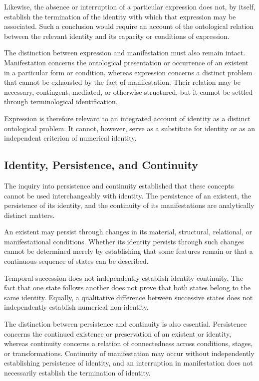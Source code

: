 Likewise, the absence or interruption of a particular
expression does not, by itself, establish the termination
of the identity with which that expression may be associated.
Such a conclusion would require an account of the ontological
relation between the relevant identity and its capacity or
conditions of expression.

The distinction between expression and manifestation must
also remain intact. Manifestation concerns the ontological
presentation or occurrence of an existent in a particular
form or condition, whereas expression concerns a distinct
problem that cannot be exhausted by the fact of manifestation.
Their relation may be necessary, contingent, mediated, or
otherwise structured, but it cannot be settled through
terminological identification.

Expression is therefore relevant to an integrated account
of identity as a distinct ontological problem. It cannot,
however, serve as a substitute for identity or as an
independent criterion of numerical identity.


\subsection{Identity, Persistence, and Continuity}

The inquiry into persistence and continuity established
that these concepts cannot be used interchangeably with
identity. The persistence of an existent, the persistence
of its identity, and the continuity of its manifestations
are analytically distinct matters.

An existent may persist through changes in its material,
structural, relational, or manifestational conditions.
Whether its identity persists through such changes cannot
be determined merely by establishing that some features
remain or that a continuous sequence of states can be
described.

Temporal succession does not independently establish
identity continuity. The fact that one state follows another
does not prove that both states belong to the same identity.
Equally, a qualitative difference between successive states
does not independently establish numerical non-identity.

The distinction between persistence and continuity is also
essential. Persistence concerns the continued existence or
preservation of an existent or identity, whereas continuity
concerns a relation of connectedness across conditions,
stages, or transformations. Continuity of manifestation
may occur without independently establishing persistence
of identity, and an interruption in manifestation does not
necessarily establish the termination of identity.

